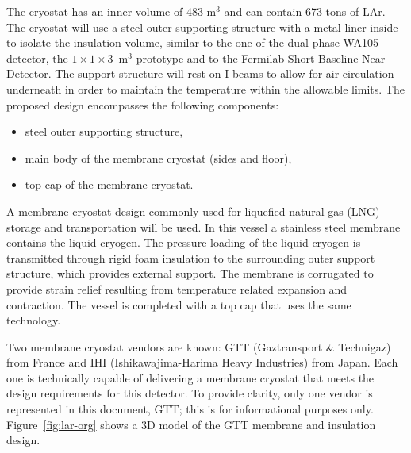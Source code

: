 The cryostat has an inner volume of 483 m$^3$ and can contain  673 tons of LAr.
%
%
The cryostat will use a steel outer supporting structure with a metal liner inside to isolate the insulation volume, similar to the one of the dual phase WA105 detector, the $1\times1\times3$~m$^3$ prototype and to the Fermilab Short-Baseline Near Detector. 
The support structure will rest on I-beams to allow for air circulation underneath in order to maintain the temperature within the allowable limits. The proposed design encompasses the following components:
%
\begin{itemize}
\item steel outer supporting structure,
\item main body of the membrane cryostat (sides and floor), 
\item top cap of the membrane cryostat.
\end{itemize}
%
A membrane cryostat design commonly used for liquefied natural gas (LNG) storage and transportation will be used. In this vessel a stainless steel membrane contains the liquid cryogen. The pressure loading of the liquid cryogen is transmitted through rigid foam insulation to the surrounding outer support structure, which provides external support. The membrane is corrugated to provide strain relief resulting from temperature related expansion and contraction. The vessel is completed with a top cap that uses the same technology.

Two membrane cryostat vendors are known: GTT (Gaztransport \& Technigaz) from France and IHI (Ishikawajima-Harima Heavy Industries) from Japan. Each one is technically capable of delivering a membrane cryostat that meets the design requirements for this detector. To provide clarity, only one vendor is represented in this document, GTT; this is for informational purposes only. Figure~\ref{fig:lar-org} shows a 3D model of the GTT membrane and insulation design.

